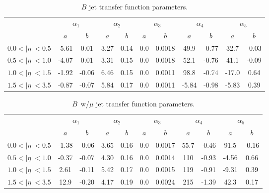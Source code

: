 \begin{itemize}
\begin{itemize}
\begin{table}[!h!tbp]
\begin{center}
\caption{$B$ jet transfer function parameters.}
\label{bjettfparams}
\begin{tabular}{c|cc|cc|cc|cc|cc}
&	\multicolumn{2}{c|}{$\alpha_{1}$}		& \multicolumn{2}{c|}{$\alpha_{2}$} 
&	\multicolumn{2}{c|}{$\alpha_{3}$}		& \multicolumn{2}{c|}{$\alpha_{4}$} 
&	\multicolumn{2}{c}{$\alpha_{5}$}		\\
				& 	$a$	&	$b$	&	$a$	&	$b$	& 	$a$	&	$b$	& 	$a$	&	$b$	& 	$a$	&	$b$	\\	
\hline
$0.0<|\eta|<0.5$	& -5.61	& 0.01	& 3.27	& 0.14	& 0.0		& 0.0018	& 49.9	& -0.77	& 32.7	& -0.03	\\
$0.5<|\eta|<1.0$	& -4.07	& 0.01	& 3.31	& 0.15	& 0.0		& 0.0018	& 52.1	& -0.76	& 41.1	& -0.09	\\
$1.0<|\eta|<1.5$	& -1.92	& -0.06	& 6.46	& 0.15	& 0.0		& 0.0011	& 98.8	& -0.74	& -17.0	& 0.64	\\
$1.5<|\eta|<3.5$	& -0.87	& -0.07	& 5.84	& 0.17	& 0.0		& 0.0011	& -5.84	& -0.98	& -5.83	& 0.39	\\
\end{tabular}
\vspace{-0.1 in}
\end{center}
\end{table} 


\begin{table}[!h!tbp]
\begin{center}
\caption{$B$~w/$\mu$ jet transfer function parameters.}
\label{bmujettfparams}
\begin{tabular}{c|cc|cc|cc|cc|cc}
&	\multicolumn{2}{c|}{$\alpha_{1}$}		& \multicolumn{2}{c|}{$\alpha_{2}$} 
&	\multicolumn{2}{c|}{$\alpha_{3}$}		& \multicolumn{2}{c|}{$\alpha_{4}$} 
&	\multicolumn{2}{c}{$\alpha_{5}$}		\\
				& 	$a$	&	$b$	&	$a$	&	$b$	& 	$a$	&	$b$	& 	$a$	&	$b$	& 	$a$	&	$b$	\\	
\hline
$0.0<|\eta|<0.5$	& -1.38	& -0.06	& 3.65	& 0.16	& 0.0		& 0.0017	& 55.7	& -0.46	& 91.5	& -0.16	\\
$0.5<|\eta|<1.0$	& -0.37	& -0.07	& 4.30	& 0.16	& 0.0		& 0.0014	& 110	& -0.93	& -4.56	& 0.66	\\
$1.0<|\eta|<1.5$	& 2.61	& -0.11	& 5.42	& 0.17	& 0.0		& 0.0015	& 119	& -0.91	& -9.31	& 0.39	\\
$1.5<|\eta|<3.5$	& 12.9	& -0.20	& 4.17	& 0.19	& 0.0		& 0.0024	& 215	& -1.39	& 42.3	& 0.17	\\
\end{tabular}
\vspace{-0.1 in}
\end{center}
\end{table} 






\end{itemize}
\end{itemize}
